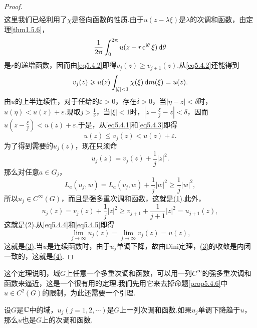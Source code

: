 \begin{proof}
\begin{align}
\end{align}
这里我们已经利用了$\chi$是径向函数的性质.由于$u(z-\lambda\xi)$是$\lambda$的次调和函数，由定理\ref{thm1.5.6}，
\[\frac1{2\uppi}\int_{0}^{2\uppi}u(z-r\operatorname{\!\!\;\mathrm e}^{\mathrm i\theta}\xi)\mathop{}\!\mathrm{d}\theta\]
是$r$的递增函数，因而由\eqref{eq5.4.2}即得$v_j(z)\ge v_{j+1}(z)$.从\eqref{eq5.4.2}还能得到
\begin{equation}\label{eq5.4.3}
	v_j(z)\geqslant u(z)\int_{|\xi|<1}\chi(\xi)\mathop{}\!\mathrm{d} m(\xi)=u(z).
\end{equation}
由$u$的上半连续性，对于任给的$\varepsilon>0$，存在$\delta>0$，当$|\eta-z|<\delta$时，$u(\eta)<u(z)+\varepsilon$.现取$j>\frac1\delta$，当$|\xi|<1$时，$\left|z-\frac{\xi}{j}-z\right|<\delta$，因而$u\left(z-\frac{\xi}{j}\right)<u(z)+\varepsilon$.于是，从\eqref{eq5.4.1}和\eqref{eq5.4.3}即得
\begin{equation}\label{eq5.4.4}
	u(z)\le v_j(z)<u(z)+\varepsilon.
\end{equation}
为了得到需要的$u_j(z)$，现在只须命
\begin{equation}\label{eq5.4.5}
	u_j(z)=v_j(z)+\frac1j |z|^2.
\end{equation}
那么对任意$a\in G_j$，
\[L_a(u_j,w)=L_a(v_j,w)+\frac1j |w|^2\ge\frac1j |w|^2,\]
所以$u_j\in C^\infty(G)$，而且是强多重次调和函数，这就是\hyperlink{5.4.8}{(1)}.此外，
\[u_j(z)=v_j(z)+\frac1j |z|^2\ge v_{j+1}+\frac1{j+1}|z|^2=u_{j+1}(z),\]
这就是\hyperlink{5.4.8}{(2)}.从\eqref{eq5.4.4}和\eqref{eq5.4.5}即得
\[\lim_{j\to\infty} u_j(z)=\lim_{j\to\infty}v_j(z)=u(z),\]
这就是\hyperlink{5.4.8}{(3)}.当$u$是连续函数时，由于$u_j$单调下降，故由Dini定理，\hyperlink{5.4.8}{(3)}的收敛是内闭一致的，这就是\hyperlink{5.4.8}{(4)}.
\end{proof}
这个定理说明，域$G$上任意一个多重次调和函数，可以用一列$C^\infty$的强多重次调和函数来逼近，这是一个很有用的定理.我们先用它来去掉命题\ref{prop5.4.6}中$u\in C^2(G)$的限制，为此还需要一个引理.
\begin{lemma}\label{lem5.4.9}
	设$G$是$\mathbb C$中的域，$u_j(j=1,2,\cdots)$是$G$上一列次调和函数.如果$u_j$单调下降趋于$u$，那么$u$也是$G$上的次调和函数.
\end{lemma}
